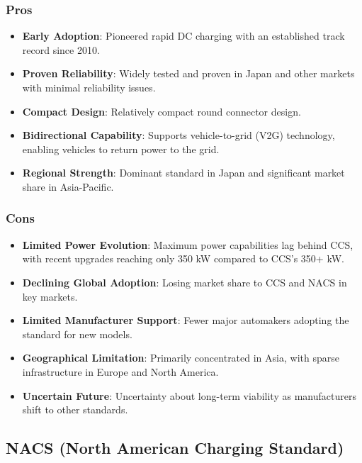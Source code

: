 \documentclass[12pt]{article}
\begin{document}
\subsubsection{Pros}
\begin{itemize}
    \item \textbf{Early Adoption}: Pioneered rapid DC charging with an established track record since 2010.
    \item \textbf{Proven Reliability}: Widely tested and proven in Japan and other markets with minimal reliability issues.
    \item \textbf{Compact Design}: Relatively compact round connector design.
    \item \textbf{Bidirectional Capability}: Supports vehicle-to-grid (V2G) technology, enabling vehicles to return power to the grid.
    \item \textbf{Regional Strength}: Dominant standard in Japan and significant market share in Asia-Pacific.
\end{itemize}

\subsubsection{Cons}
\begin{itemize}
    \item \textbf{Limited Power Evolution}: Maximum power capabilities lag behind CCS, with recent upgrades reaching only 350 kW compared to CCS's 350+ kW.
    \item \textbf{Declining Global Adoption}: Losing market share to CCS and NACS in key markets.
    \item \textbf{Limited Manufacturer Support}: Fewer major automakers adopting the standard for new models.
    \item \textbf{Geographical Limitation}: Primarily concentrated in Asia, with sparse infrastructure in Europe and North America.
    \item \textbf{Uncertain Future}: Uncertainty about long-term viability as manufacturers shift to other standards.
\end{itemize}

\subsection{NACS (North American Charging Standard)}
\end{document}
